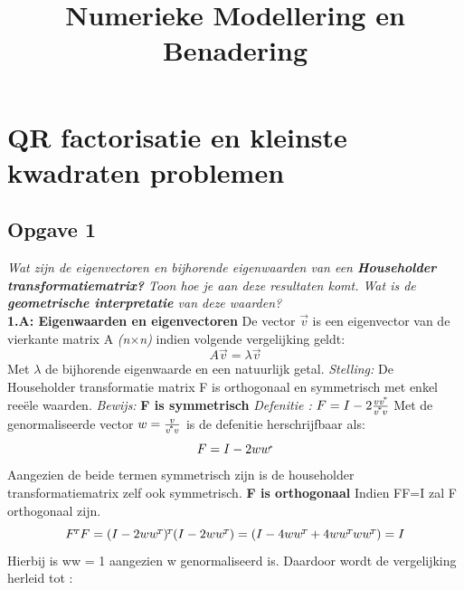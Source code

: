 \documentclass{Numerieke}
\newcommand\inv[1]{#1\raisebox{0.8ex}{$\scriptscriptstyle\!*$}}
\newcommand\transpose[1]{#1\raisebox{0.8ex}{$\scriptscriptstyle\!T$}}
\begin{document}

\title{Numerieke Modellering en Benadering}
\maketitle

\section{QR factorisatie en kleinste kwadraten problemen}
\subsection{Opgave 1}
\textit{Wat zijn de eigenvectoren en bijhorende eigenwaarden van een 
	\textbf{Householder transformatiematrix?}
	Toon hoe je aan deze resultaten komt. Wat is de 
	\textbf{geometrische interpretatie}
	van deze waarden?
} \\
\newline
\textbf{1.A: Eigenwaarden en eigenvectoren} \newline
De vector $\vec{v}$ is een eigenvector van de vierkante matrix A \textit{(n$\times$n)} indien volgende vergelijking geldt:
 \[A\vec{v} = \lambda\vec{v}\] 
 Met $\lambda$  de bijhorende eigenwaarde en een natuurlijk getal.\newline 
 \newline
 \textit{Stelling:} \newline
 De Householder transformatie matrix F is orthogonaal en symmetrisch met enkel reeële waarden. \newline
 \textit{Bewijs: } \newline
 \textbf{F is symmetrisch} \newline
 \textit{Defenitie :} \(F=I-2\frac{v\inv{v}}{\inv{v}v}  \)
 \newline
 Met de genormaliseerde vector \(w = \frac{v}{\inv{v}v}\) is de defenitie herschrijfbaar als: 
 \[F=I-2w\inv{w}\]
 Aangezien de beide termen symmetrisch zijn is de householder transformatiematrix zelf ook symmetrisch.\newline
 \textbf{F is orthogonaal} \newline
 Indien \transpose{F}F=I zal F orthogonaal zijn.
 \[\transpose{F}F = \transpose{(I-2w\transpose{w})}(I-2w\transpose{w}) = (I-4w\transpose{w}+4w\transpose{w}w\transpose{w}) = I\]
 Hierbij is \transpose{w}w = 1 aangezien w genormaliseerd is. Daardoor wordt de vergelijking herleid tot : \newline
\end{document}
